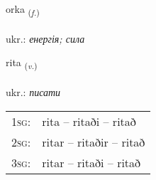 \documentclass[frontgrid, backgrid]{flacards}\usepackage[]{graphicx}\usepackage[]{xcolor}
\begin{document}
\renewcommand{\flhead}{\vskip5pt \fboxsep=0pt {\small\bfseries\footnotesize Nafnorð | іменник}}
\renewcommand{\fcfoot}{\vskip5pt \fboxsep=0pt \hspace{2pt}{\small\bfseries\footnotesize 2K}}

\renewcommand{\blhead}{\vskip5pt {\small\bfseries\footnotesize Nafnorð | іменник }}
\renewcommand{\bcfoot}{\vskip5pt \hspace{2pt}{\small\bfseries\footnotesize 2K}}


{orka \small{\textsubscript{(\textit{f.})}} \\[1ex] %
\textphonetic{[ɔr̥ka]} \\
ukr.: \emph{енергія; сила} \\  [2ex]
\renewcommand*{\arraystretch}{0.8}
}

\renewcommand{\flhead}{\vskip5pt \fboxsep=0pt {\small\bfseries\footnotesize Sagnorð | дієслово}}
\renewcommand{\fcfoot}{\vskip5pt \fboxsep=0pt \hspace{2pt}{\small\bfseries\footnotesize 2K}}

\renewcommand{\blhead}{\vskip5pt {\small\bfseries\footnotesize Sagnorð | дієслово }}
\renewcommand{\bcfoot}{\vskip5pt \hspace{2pt}{\small\bfseries\footnotesize 2K}}


{rita \small{\textsubscript{(\textit{v.})}} \\[1ex] %
\textphonetic{[rɪːta]} \\
ukr.: \emph{писати} \\  [2ex]
\renewcommand*{\arraystretch}{0.8}
\begin{tabular}{p{1cm}l}
\textsc{1sg}: & rita -- ritaði -- ritað \\ 
\textsc{2sg}: & ritar -- ritaðir -- ritað \\ 
\textsc{3sg}: & ritar -- ritaði -- ritað \\ 
\end{tabular}
}
\end{document}

